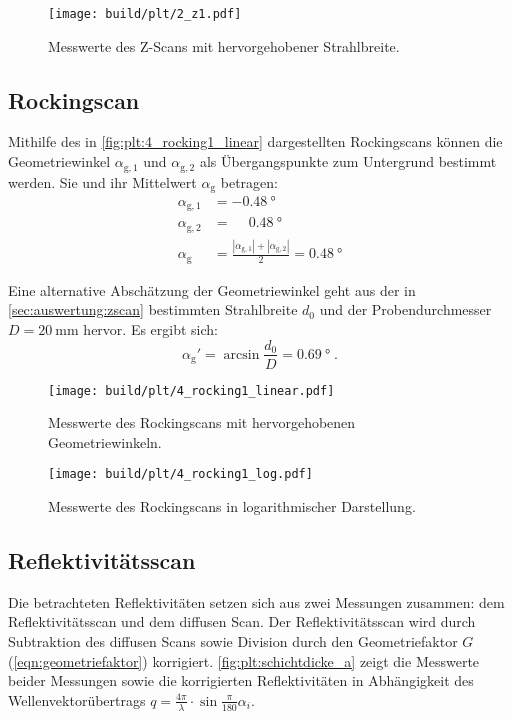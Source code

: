 \begin{figure}
    \centering
    \texttt{[image: build/plt/2\_z1.pdf]}
    \caption{Messwerte des Z-Scans mit hervorgehobener Strahlbreite.}
    \label{fig:plt:2_z1}
\end{figure}


\FloatBarrier
\subsection{Rockingscan} \label{sec:auswertung:rockingscan}
Mithilfe des in \autoref{fig:plt:4_rocking1_linear}
dargestellten Rockingscans
können die Geometriewinkel $\alpha_{\text{g}, 1}$ und $\alpha_{\text{g}, 2}$
als Übergangspunkte zum Untergrund bestimmt werden.
Sie und ihr Mittelwert $\alpha_\text{g}$ betragen:
\begin{align*}
    \alpha_{\text{g}, 1} &= \SI{-0.48}{\degree} \\
    \alpha_{\text{g}, 2} &= \phantom{-} \SI{0.48}{\degree} \\
    \alpha_\text{g} &= \frac{|\alpha_{\text{g}, 1}| + |\alpha_{\text{g}, 2}|}{2}
        = \SI{0.48}{\degree}
\end{align*}

Eine alternative Abschätzung der Geometriewinkel
geht aus der in \autoref{sec:auswertung:zscan} bestimmten Strahlbreite $d_0$ und der Probendurchmesser $D = \SI{20}{\milli\meter}$ hervor.
Es ergibt sich:
\[
    \alpha_\text{g}' = \arcsin{\frac{d_0}{D}}
    = \SI{0.69}{\degree} \; .
\]

\begin{figure}
    \centering
    \texttt{[image: build/plt/4\_rocking1\_linear.pdf]}
    \caption{Messwerte des Rockingscans mit hervorgehobenen Geometriewinkeln.}
    \label{fig:plt:4_rocking1_linear}
\end{figure}

\begin{figure}
    \centering
    \texttt{[image: build/plt/4\_rocking1\_log.pdf]}
    \caption{Messwerte des Rockingscans in logarithmischer Darstellung.}
    \label{fig:plt:4_rocking1_log}
\end{figure}


\FloatBarrier
\subsection{Reflektivitätsscan} \label{sec:auswertung:schichtdicke}
Die betrachteten Reflektivitäten setzen sich aus zwei Messungen zusammen:
dem Reflektivitätsscan und dem diffusen Scan.
Der Reflektivitätsscan wird durch
    Subtraktion des diffusen Scans sowie
    Division durch den Geometriefaktor $G$ (\autoref{eqn:geometriefaktor})
korrigiert.
\autoref{fig:plt:schichtdicke_a} zeigt die Messwerte beider Messungen sowie die korrigierten Reflektivitäten
in Abhängigkeit des Wellenvektorübertrags $q = \frac{4\pi}{\lambda} · \sin{\frac{\pi}{180} \alpha_i}$.

